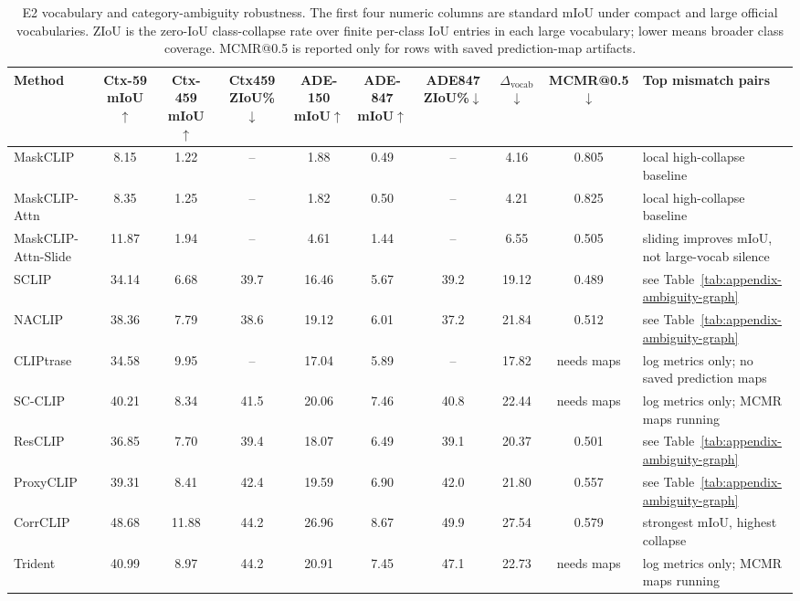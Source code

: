 \documentclass[11pt,a4paper]{article}
\newcommand{\up}{\ensuremath{\uparrow}}
\newcommand{\down}{\ensuremath{\downarrow}}
\begin{document}
\begin{table}[H]
\centering
\scriptsize
\caption{E2 vocabulary and category-ambiguity robustness. The first four numeric columns are standard mIoU under compact and large official vocabularies. ZIoU is the zero-IoU class-collapse rate over finite per-class IoU entries in each large vocabulary; lower means broader class coverage. MCMR@0.5 is reported only for rows with saved prediction-map artifacts.}
\label{tab:e2-ambiguity}
\setlength{\tabcolsep}{1.6pt}
\begin{adjustbox}{max width=\textwidth}
\begin{tabular}{l c c c c c c c c p{}}
\toprule
Method & Ctx-59 mIoU\up & Ctx-459 mIoU\up & Ctx459 ZIoU\%\down & ADE-150 mIoU\up & ADE-847 mIoU\up & ADE847 ZIoU\%\down & $\Delta_{\mathrm{vocab}}$\down & MCMR@0.5\down & Top mismatch pairs \\
\midrule
MaskCLIP & 8.15 & 1.22 & -- & 1.88 & 0.49 & -- & 4.16 & 0.805 & local high-collapse baseline \\
MaskCLIP-Attn & 8.35 & 1.25 & -- & 1.82 & 0.50 & -- & 4.21 & 0.825 & local high-collapse baseline \\
MaskCLIP-Attn-Slide & 11.87 & 1.94 & -- & 4.61 & 1.44 & -- & 6.55 & 0.505 & sliding improves mIoU, not large-vocab silence \\
SCLIP & 34.14 & 6.68 & 39.7 & 16.46 & 5.67 & 39.2 & 19.12 & 0.489 & see Table~\ref{tab:appendix-ambiguity-graph} \\
NACLIP & 38.36 & 7.79 & 38.6 & 19.12 & 6.01 & 37.2 & 21.84 & 0.512 & see Table~\ref{tab:appendix-ambiguity-graph} \\
CLIPtrase & 34.58 & 9.95 & -- & 17.04 & 5.89 & -- & 17.82 & needs maps & log metrics only; no saved prediction maps \\
SC-CLIP & 40.21 & 8.34 & 41.5 & 20.06 & 7.46 & 40.8 & 22.44 & needs maps & log metrics only; MCMR maps running \\
ResCLIP & 36.85 & 7.70 & 39.4 & 18.07 & 6.49 & 39.1 & 20.37 & 0.501 & see Table~\ref{tab:appendix-ambiguity-graph} \\
ProxyCLIP & 39.31 & 8.41 & 42.4 & 19.59 & 6.90 & 42.0 & 21.80 & 0.557 & see Table~\ref{tab:appendix-ambiguity-graph} \\
CorrCLIP & 48.68 & 11.88 & 44.2 & 26.96 & 8.67 & 49.9 & 27.54 & 0.579 & strongest mIoU, highest collapse \\
Trident & 40.99 & 8.97 & 44.2 & 20.91 & 7.45 & 47.1 & 22.73 & needs maps & log metrics only; MCMR maps running \\

\end{tabular}
\end{adjustbox}
\end{table}
\end{document}
